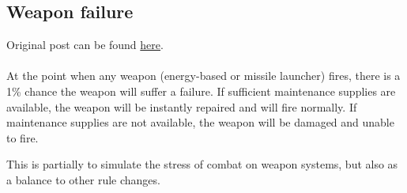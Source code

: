 \documentclass[../../Aurora C# unofficial manual.tex]{subfiles}
\begin{document}
	\subsection{Weapon failure}
	Original post can be found
	\href{http://aurora2.pentarch.org/index.php?topic=8495.msg107701#msg107701}{here}.
	\\\\
	
	
	At the point when any weapon (energy-based or missile launcher) fires, there is a 1\% chance the weapon will suffer a failure. If sufficient maintenance supplies are available, the weapon will be instantly repaired and will fire normally. If maintenance supplies are not available, the weapon will be damaged and unable to fire.
	
	This is partially to simulate the stress of combat on weapon systems, but also as a balance to other rule changes.
\end{document}
